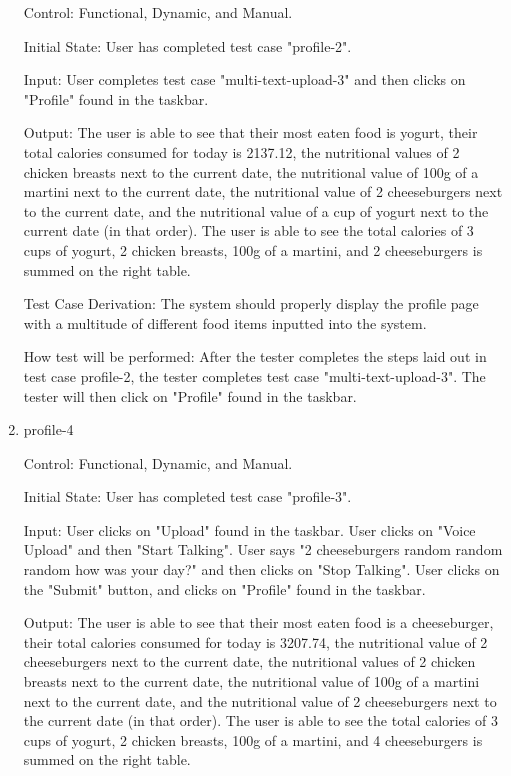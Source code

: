 \documentclass[12pt, titlepage]{article}
\begin{document}
\begin{enumerate}
		Control: Functional, Dynamic, and Manual.
		
		Initial State: User has completed test case "profile-2".
		
		Input: User completes test case "multi-text-upload-3" and then clicks on "Profile" found in the taskbar.
		
		Output: The user is able to see that their most eaten food is yogurt, their total calories consumed for today is 2137.12, the nutritional values of 2 chicken breasts next to the current date, the nutritional value of 100g of a martini next to the current date, the nutritional value of 2 cheeseburgers next to the current date, and the nutritional value of a cup of yogurt next to the current date (in that order). The user is able to see the total calories of 3 cups of yogurt, 2 chicken breasts, 100g of a martini, and 2 cheeseburgers is summed on the right table.
		
		Test Case Derivation: The system should properly display the profile page with a multitude of different food items inputted into the system.
		
		How test will be performed: After the tester completes the steps laid out in test case profile-2, the tester completes test case "multi-text-upload-3". The tester will then click on "Profile" found in the taskbar.
		
		\item{profile-4\\}
		
		Control: Functional, Dynamic, and Manual.
		
		Initial State: User has completed test case "profile-3".
		
		Input: User clicks on "Upload" found in the taskbar. User clicks on "Voice Upload" and then "Start Talking". User says "2 cheeseburgers random random random how was your day?" and then clicks on "Stop Talking". User clicks on the "Submit" button, and clicks on "Profile" found in the taskbar.
		
		Output: The user is able to see that their most eaten food is a cheeseburger, their total calories consumed for today is 3207.74, the nutritional value of 2 cheeseburgers next to the current date, the nutritional values of 2 chicken breasts next to the current date, the nutritional value of 100g of a martini next to the current date, and the nutritional value of 2 cheeseburgers next to the current date (in that order). The user is able to see the total calories of 3 cups of yogurt, 2 chicken breasts, 100g of a martini, and 4 cheeseburgers is summed on the right table.
		

\end{enumerate}
\end{document}
